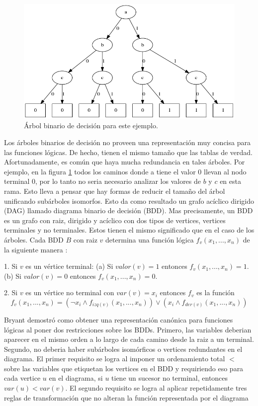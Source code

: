 \begin{figure}[h!]
  \centering
  \includegraphics[width=1\textwidth]{Figures/BDT.png}
  \caption{Árbol binario de decisión para este ejemplo.}
  \label{fig:bdt1}
\end{figure}

Los árboles binarios de decisión no proveen una representación muy concisa para las funciones lógicas. De hecho, tienen el mismo tamaño que las tablas de verdad. Afortunadamente, es común que haya mucha redundancia en tales árboles. Por ejemplo, en la figura \ref{fig:bdt1} todos los caminos donde a tiene el valor 0 llevan al nodo terminal 0, por lo tanto no seria necesario analizar los valores de $b$ y $c$ en esta rama. Esto lleva a pensar que hay formas de reducir el tamaño del árbol unificando subárboles isomorfos. Esto da como resultado un grafo acíclico dirigido (DAG) llamado diagrama binario de decisión (BDD). Mas precisamente, un BDD es un grafo con raiz, dirigido y acíclico con dos tipos de vertices, vertices terminales y no terminales. Estos tienen el mismo significado que en el caso de los árboles. Cada BDD $B$ con raiz $v$ determina una función lógica $f_{v}(x_{1},...,x_{n})$ de la siguiente manera \cite{Clarke:1}:

1. Si $v$ es un vértice terminal:
  (a) Si $valor(v) = 1$ entonces $f_{v}(x_{1},...,x_{n}) = 1$.
  (b) Si $valor(v) = 0$ entonces $f_{v}(x_{1},...,x_{n}) = 0$.

2. Si $v$ es un vértice no terminal con $var(v) = x_{i}$ entonces $f_{v}$ es la función 
\[f_{v}(x_{1},...,x_{n}) = (\neg x_{i} \land f_{izq(v)}(x_{1},...,x_{n})) \lor (x_{i} \land f_{der(v)}(x_{1},...,x_{n}))\]

Bryant \cite{Bryant:8} demostró como obtener una representación canónica para funciones lógicas al poner dos restricciones sobre los BDDs. Primero, las variables deberian aparecer en el mismo orden a lo largo de cada camino desde la raiz a un terminal. Segundo, no deberia haber subárboles isomórficos o vertices redundantes en el diagrama. El primer requisito se logra al imponer un ordenamiento total $<$ sobre las variables que etiquetan los vertices en el BDD y requiriendo eso para cada vertice $u$ en el diagrama, si $u$ tiene un sucesor no terminal, entonces $var(u) < var(v)$. El segundo requisito se logra al aplicar repetidamente tres reglas de transformación que no alteran la función representada por el diagrama

